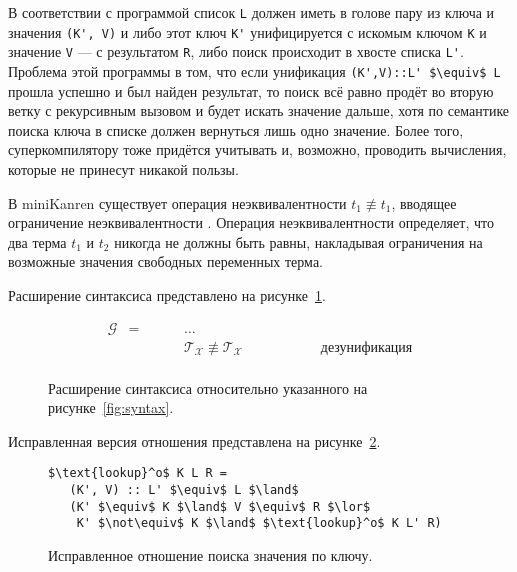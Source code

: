 В соответствии с программой список \lstinline{L} должен иметь в голове пару из ключа и значения \lstinline{(K', V)}
и либо  этот ключ \lstinline{K'} унифицируется с искомым ключом \lstinline{K} и
значение \lstinline{V} --- с результатом \lstinline{R},
либо поиск происходит в хвосте списка \lstinline{L'}. Проблема этой программы в том,
что если унификация \lstinline{(K',V)::L' $\equiv$ L} прошла успешно и был
найден результат, то поиск всё равно продёт во вторую ветку с рекурсивным вызовом и будет
искать значение дальше, хотя по семантике поиска ключа в списке должен вернуться лишь одно значение.
Более того, суперкомпилятору тоже придётся учитывать и, возможно, проводить вычисления,
которые не принесут никакой пользы.

В miniKanren существует операция неэквивалентности $t_1 \not\equiv t_1$, вводящее
ограничение неэквивалентности \cite{mkConstr}.
Операция неэквивалентности определяет, что два терма $t_1$ и $t_2$ никогда не должны быть равны,
накладывая ограничения на возможные значения свободных переменных терма.

Расширение синтаксиса \ukanren представлено на рисунке~\ref{fig:syntaxExt}.

\begin{figure}[h!]
\centering
\[\begin{array}{ccll}
\mathcal{G}   & = & \hspace{1cm} \dots & \\
              &   & \hspace{1cm} \mathcal{T_X}\not\equiv\mathcal{T_X} \hspace{2cm} &\mbox{дезунификация} \\
\end{array}\]
\caption{Расширение синтаксиса \ukanren относительно указанного на рисунке~\ref{fig:syntax}.}
\label{fig:syntaxExt}
\end{figure}

Исправленная версия отношения  представлена на рисунке~\ref{fig:lookupExt}.

\begin{figure}[h!]
\begin{lstlisting}
$\text{lookup}^o$ K L R =
   (K', V) :: L' $\equiv$ L $\land$
   (K' $\equiv$ K $\land$ V $\equiv$ R $\lor$
    K' $\not\equiv$ K $\land$ $\text{lookup}^o$ K L' R)
\end{lstlisting}
\caption{Исправленное отношение поиска значения по ключу.}
\label{fig:lookupExt}
\end{figure}

